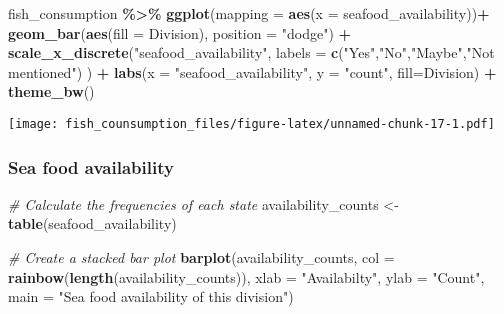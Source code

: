 \documentclass[
]{article}
\newenvironment{Shaded}{\begin{snugshade}}{\end{snugshade}}
\newcommand{\AttributeTok}[1]{\textcolor[rgb]{0.13,0.29,0.53}{#1}}
\newcommand{\CommentTok}[1]{\textcolor[rgb]{0.56,0.35,0.01}{\textit{#1}}}
\newcommand{\FunctionTok}[1]{\textcolor[rgb]{0.13,0.29,0.53}{\textbf{#1}}}
\newcommand{\NormalTok}[1]{#1}
\newcommand{\OtherTok}[1]{\textcolor[rgb]{0.56,0.35,0.01}{#1}}
\newcommand{\SpecialCharTok}[1]{\textcolor[rgb]{0.81,0.36,0.00}{\textbf{#1}}}
\newcommand{\StringTok}[1]{\textcolor[rgb]{0.31,0.60,0.02}{#1}}
\begin{document}
\begin{Shaded}
\begin{Highlighting}[]
\NormalTok{fish\_consumption }\SpecialCharTok{\%\textgreater{}\%}
\FunctionTok{ggplot}\NormalTok{(}\AttributeTok{mapping =} \FunctionTok{aes}\NormalTok{(}\AttributeTok{x =}\NormalTok{ seafood\_availability))}\SpecialCharTok{+}
\FunctionTok{geom\_bar}\NormalTok{(}\FunctionTok{aes}\NormalTok{(}\AttributeTok{fill =}\NormalTok{ Division), }\AttributeTok{position =} \StringTok{"dodge"}\NormalTok{) }\SpecialCharTok{+}
\FunctionTok{scale\_x\_discrete}\NormalTok{(}\StringTok{"seafood\_availability"}\NormalTok{, }\AttributeTok{labels =} \FunctionTok{c}\NormalTok{(}\StringTok{"Yes"}\NormalTok{,}\StringTok{"No"}\NormalTok{,}\StringTok{"Maybe"}\NormalTok{,}\StringTok{"Not mentioned"}\NormalTok{) ) }\SpecialCharTok{+}
\FunctionTok{labs}\NormalTok{(}\AttributeTok{x =} \StringTok{"seafood\_availability"}\NormalTok{, }\AttributeTok{y =} \StringTok{"count"}\NormalTok{, }\AttributeTok{fill=}\StringTok{\textquotesingle{}Division\textquotesingle{}}\NormalTok{) }\SpecialCharTok{+}
\FunctionTok{theme\_bw}\NormalTok{()}
\end{Highlighting}
\end{Shaded}

\texttt{[image: fish\_counsumption\_files/figure-latex/unnamed-chunk-17-1.pdf]}

\hypertarget{sea-food-availability}{%
\subsubsection{Sea food availability}\label{sea-food-availability}}

\begin{Shaded}
\begin{Highlighting}[]
\CommentTok{\# Calculate the frequencies of each state}
\NormalTok{availability\_counts }\OtherTok{\textless{}{-}} \FunctionTok{table}\NormalTok{(seafood\_availability)}

\CommentTok{\# Create a stacked bar plot}
\FunctionTok{barplot}\NormalTok{(availability\_counts, }\AttributeTok{col =} \FunctionTok{rainbow}\NormalTok{(}\FunctionTok{length}\NormalTok{(availability\_counts)), }
        \AttributeTok{xlab =} \StringTok{"Availabilty"}\NormalTok{, }\AttributeTok{ylab =} \StringTok{"Count"}\NormalTok{, }\AttributeTok{main =} \StringTok{"Sea food availability of this division"}\NormalTok{)}
\end{Highlighting}
\end{Shaded}
\end{document}
